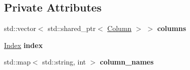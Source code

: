 \subsection*{Private Attributes}
\begin{DoxyCompactItemize}
\item 
\mbox{\label{classDataFrame_a9c466c6766286ba229148f45e3a8eb87}} 
std\+::vector$<$ std\+::shared\+\_\+ptr$<$ \hyperlink{classColumn}{Column} $>$ $>$ {\bfseries columns}
\item 
\mbox{\label{classDataFrame_ad7cc010c9b8cf5460ffd889c08feed32}} 
\hyperlink{classIndex}{Index} {\bfseries index}
\item 
\mbox{\label{classDataFrame_ae655c8a49567c2acd61bd2f05276779a}} 
std\+::map$<$ std\+::string, int $>$ {\bfseries column\+\_\+names}
\end{DoxyCompactItemize}
